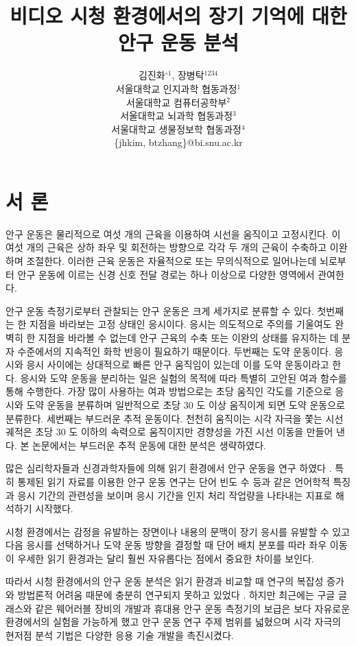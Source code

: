 \documentclass{kcc}
\title{비디오 시청 환경에서의 장기 기억에 대한 안구 운동 분석}
\author{
김진화$^{\circ1}$, 장병탁$^{1234}$\\
서울대학교 인지과학 협동과정$^{1}$\\
서울대학교 컴퓨터공학부$^{2}$\\
서울대학교 뇌과학 협동과정$^{3}$\\
서울대학교 생물정보학 협동과정$^{4}$\\
\{jhkim, btzhang\}@bi.snu.ac.kr
}
\begin{document}
\maketitle


\section{서 론}
안구 운동은 물리적으로 여섯 개의 근육을 이용하여 시선을 움직이고 고정시킨다. 이 여섯 개의 근육은 상하 좌우 및 회전하는 방향으로 각각 두 개의 근육이 수축하고 이완하며 조절한다. 이러한 근육 운동은 자율적으로 또는 무의식적으로 일어나는데 뇌로부터 안구 운동에 이르는 신경 신호 전달 경로는 하나 이상으로 다양한 영역에서 관여한다.

안구 운동 측정기로부터 관찰되는 안구 운동은 크게 세가지로 분류할 수 있다. 첫번째는 한 지점을 바라보는 고정 상태인 응시이다. 응시는 의도적으로 주의를 기울여도 완벽히 한 지점을 바라볼 수 없는데 안구 근육의 수축 또는 이완의 상태를 유지하는 데 분자 수준에서의 지속적인 화학 반응이 필요하기 때문이다. 두번째는 도약 운동이다. 응시와 응시 사이에는 상대적으로 빠른 안구 움직임이 있는데 이를 도약 운동이라고 한다. 응시와 도약 운동을 분리하는 일은 실험의 목적에 따라 특별히 고안된 여과 함수를 통해 수행한다. 가장 많이 사용하는 여과 방법으로는 초당 움직인 각도를 기준으로 응시와 도약 운동을 분류하며 일반적으로 초당 30 도 이상 움직이게 되면 도약 운동으로 분류한다. 세번째는 부드러운 추적 운동이다. 천천히 움직이는 시각 자극을 쫓는 시선 궤적은 초당 30 도 이하의 속력으로 움직이지만 경향성을 가진 시선 이동을 만들어 낸다. 본 논문에서는 부드러운 추적 운동에 대한 분석은 생략하였다.

많은 심리학자들과 신경과학자들에 의해 읽기 환경에서 안구 운동을 연구 하였다 \cite{Rayner1998,Reichle1998}. 특히 통제된 읽기 자료를 이용한 안구 운동 연구\cite{Inhoff1986,Rayner1986}는 단어 빈도 수 등과 같은 언어학적 특징과 응시 기간의 관련성을 보이며 응시 기간을 인지 처리 작업량을 나타내는 지표로 해석하기 시작했다. 

시청 환경에서는 감정을 유발하는 장면이나 내용의 문맥이 장기 응시를 유발할 수 있고 다음 응시를 선택하거나 도약 운동 방향을 결정할 때 단어 배치 분포를 따라 좌우 이동이 우세한 읽기 환경과는 달리 훨씬 자유롭다는 점에서 중요한 차이를 보인다.

따라서 시청 환경에서의 안구 운동 분석은 읽기 환경과 비교할 때 연구의 복잡성 증가와 방법론적 어려움 때문에 충분히 연구되지 못하고 있었다 \cite{Tatler2011}. 하지만 최근에는 구글 글래스와 같은 웨어러블 장비의 개발과 휴대용 안구 운동 측정기의 보급은 보다 자유로운 환경에서의 실험을 가능하게 했고 안구 운동 연구 주제 범위를 넓혔으며 시각 자극의 현저점 분석 기법\cite{itti1998model}은 다양한 응용 기술 개발을 촉진시켰다. 
\end{document}
